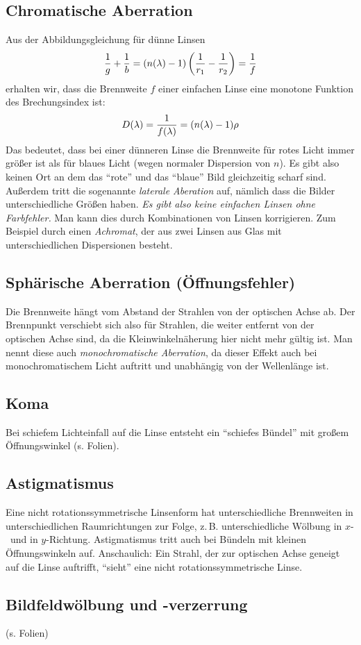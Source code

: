 \subsection{Chromatische Aberration}
Aus der Abbildungsgleichung für dünne Linsen
\begin{align*}
  \frac{1}{g} + \frac{1}{b}
  = (n(\lambda)-1) \left( \frac{1}{r_1} - \frac{1}{r_2} \right)
  = \frac{1}{f}
\end{align*}
erhalten wir, dass die Brennweite $f$ einer einfachen Linse eine
monotone Funktion des Brechungsindex ist:
\begin{align*}
  D(\lambda) 
  = \frac{1}{f(\lambda)}
  = (n(\lambda)-1)\rho
\end{align*}
Das bedeutet, dass bei einer dünneren Linse die Brennweite für rotes
Licht immer größer ist als für blaues Licht (wegen normaler Dispersion
von $n$).
Es gibt also keinen Ort an dem das \enquote{rote} und das
\enquote{blaue} Bild gleichzeitig scharf sind. Außerdem tritt die
sogenannte \emph{laterale Aberation}
auf, nämlich dass die Bilder unterschiedliche Größen haben.
\emph{Es gibt also keine einfachen Linsen ohne Farbfehler.}
Man kann dies durch Kombinationen von Linsen korrigieren. Zum Beispiel
durch einen \emph{Achromat}, der aus zwei Linsen aus Glas mit
unterschiedlichen Dispersionen besteht.

\subsection{Sphärische Aberration (Öffnungsfehler)}
Die Brennweite hängt vom Abstand der Strahlen von der optischen Achse
ab. Der Brennpunkt verschiebt sich also für Strahlen, die weiter
entfernt von der optischen Achse sind, da die Kleinwinkelnäherung hier
nicht mehr gültig ist.
Man nennt diese auch \emph{monochromatische Aberration}, da dieser
Effekt auch bei monochromatischem Licht auftritt und unabhängig von
der Wellenlänge ist.


\subsection{Koma}
Bei schiefem Lichteinfall auf die Linse entsteht ein \enquote{schiefes
  Bündel} mit großem Öffnungswinkel (s. Folien).

\subsection{Astigmatismus}
Eine nicht rotationssymmetrische Linsenform hat unterschiedliche
Brennweiten in unterschiedlichen Raumrichtungen zur Folge,
z.\,B. unterschiedliche Wölbung in $x$-~und in $y$-Richtung.
Astigmatismus tritt auch bei Bündeln mit kleinen Öffnungswinkeln auf.
Anschaulich: Ein Strahl, der zur optischen Achse geneigt auf die Linse
auftrifft, \enquote{sieht} eine nicht rotationssymmetrische Linse.


\subsection{Bildfeldwölbung und -verzerrung}
(s. Folien)


